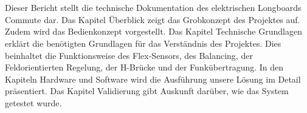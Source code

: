 \\\\
Dieser Bericht stellt die technische Dokumentation des elektrischen Longboards Commute dar. Das Kapitel Überblick zeigt das Grobkonzept des Projektes auf. Zudem wird das Bedienkonzept vorgestellt. Das Kapitel Technische Grundlagen erklärt die benötigten Grundlagen für das Verständnis des Projektes. Dies beinhaltet die Funktionsweise des Flex-Sensors, des Balancing, der Feldorientierten Regelung, der H-Brücke und der Funkübertragung. In den Kapiteln Hardware und Software wird die Ausführung unsere Lösung im Detail präsentiert. Das Kapitel Validierung gibt Auskunft darüber, wie das System getestet wurde. 

